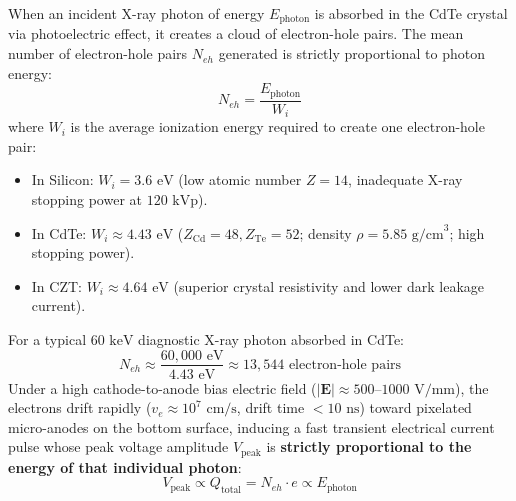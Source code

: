 \documentclass[11pt,a4paper]{article}
\begin{document}
\begin{physicsbox}
When an incident X-ray photon of energy $E_{\text{photon}}$ is absorbed in the CdTe crystal via photoelectric effect, it creates a cloud of electron-hole pairs. The mean number of electron-hole pairs $N_{eh}$ generated is strictly proportional to photon energy:
\begin{equation}
    N_{eh} = \frac{E_{\text{photon}}}{W_i}
\end{equation}
where $W_i$ is the average ionization energy required to create one electron-hole pair:
\begin{itemize}
    \item In Silicon: $W_i = 3.6\text{ eV}$ (low atomic number $Z = 14$, inadequate X-ray stopping power at $120\text{ kVp}$).
    \item In CdTe: $W_i \approx 4.43\text{ eV}$ ($Z_{\text{Cd}} = 48, Z_{\text{Te}} = 52$; density $\rho = 5.85\text{ g/cm}^3$; high stopping power).
    \item In CZT: $W_i \approx 4.64\text{ eV}$ (superior crystal resistivity and lower dark leakage current).
\end{itemize}
For a typical $60\text{ keV}$ diagnostic X-ray photon absorbed in CdTe:
\begin{equation}
    N_{eh} \approx \frac{60,000\text{ eV}}{4.43\text{ eV}} \approx 13,544 \text{ electron-hole pairs}
\end{equation}
Under a high cathode-to-anode bias electric field ($|\mathbf{E}| \approx 500\text{--}1000\text{ V/mm}$), the electrons drift rapidly ($v_e \approx 10^7\text{ cm/s}$, drift time $< 10\text{ ns}$) toward pixelated micro-anodes on the bottom surface, inducing a fast transient electrical current pulse whose peak voltage amplitude $V_{\text{peak}}$ is \textbf{strictly proportional to the energy of that individual photon}:
\begin{equation}
    V_{\text{peak}} \propto Q_{\text{total}} = N_{eh} \cdot e \propto E_{\text{photon}}
\end{equation}
\end{physicsbox}
\end{document}
